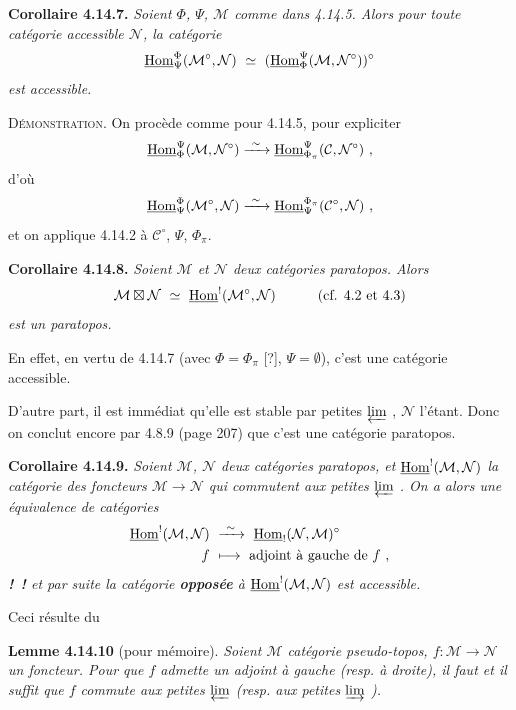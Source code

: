 \noindent\textbf{Corollaire 4.14.7.} {\itshape Soient $\Phi$, $\Psi$, $\mathcal{M}$ comme dans 4.14.5. Alors pour toute catégorie accessible $\mathcal{N}$, la catégorie
\[
\uHom^{\Phi}_{\Psi}(\mathcal{M}^{\circ},\mathcal{N})\ \simeq\ (\uHom^{\Psi}_{\Phi}(\mathcal{M},\mathcal{N}^{\circ}))^{\circ}
\]
est accessible.}

\noindent\textsc{Démonstration}. On procède comme pour 4.14.5, pour expliciter
\[
\underline{\mathrm{Hom}}^{\Psi}_{\Phi}(\mathcal{M},\mathcal{N}^{\circ}) \xrightarrow{\ \sim\ } \underline{\mathrm{Hom}}^{\Psi}_{\Phi_\pi}(\mathcal{C},\mathcal{N}^{\circ})\ ,
\]
d'où
\[
\underline{\mathrm{Hom}}^{\Phi}_{\Psi}(\mathcal{M}^{\circ},\mathcal{N}) \xrightarrow{\ \sim\ } \underline{\mathrm{Hom}}^{\Phi_\pi}_{\Psi}(\mathcal{C}^{\circ},\mathcal{N})\ ,
\]
et on applique 4.14.2 à $\mathcal{C}^{\circ}$, $\Psi$, $\Phi_\pi$.

\noindent\textbf{Corollaire 4.14.8.} {\itshape Soient $\mathcal{M}$ et $\mathcal{N}$ deux catégories paratopos. Alors
\[
\mathcal{M}\boxtimes\mathcal{N}\ \simeq\ \uHom^{!}(\mathcal{M}^{\circ},\mathcal{N}) \qquad\quad \text{(cf. 4.2 et 4.3)}
\]
est un paratopos.}

En effet, en vertu de 4.14.7 (avec $\Phi=\Phi_\pi$ [?], $\Psi=\emptyset$), c'est une catégorie accessible.


D'autre part, il est immédiat qu'elle est stable par petites $\varprojlim$ , $\mathcal{N}$ l'étant. Donc on conclut encore par 4.8.9 (page 207) que c'est une catégorie paratopos.

\noindent\textbf{Corollaire 4.14.9.} {\itshape Soient $\mathcal{M}$, $\mathcal{N}$ deux catégories paratopos, et $\underline{\mathrm{Hom}}^{!}(\mathcal{M},\mathcal{N})$ la catégorie des foncteurs $\mathcal{M}\longrightarrow\mathcal{N}$ qui commutent aux petites $\varprojlim$ . On a alors une équivalence de catégories
\[
\begin{aligned}
\uHom^{!}(\mathcal{M},\mathcal{N}) &\ \xrightarrow{\ \sim\ }\ \uHom_{!}(\mathcal{N},\mathcal{M})^{\circ}\\
f &\ \longmapsto\ \text{adjoint à gauche de } f\ ,
\end{aligned}
\]
\noindent\textup{\textbf{!}}\ \textup{\textbf{!}} et par suite la catégorie \textup{\textbf{opposée}} à $\underline{\mathrm{Hom}}^{!}(\mathcal{M},\mathcal{N})$ est accessible.} %

Ceci résulte du

\noindent\textbf{Lemme 4.14.10} (pour mémoire). {\itshape Soient $\mathcal{M}$ catégorie pseudo-topos, $f:\mathcal{M}\longrightarrow\mathcal{N}$ un foncteur. Pour que $f$ admette un adjoint à gauche (resp. à droite), il faut et il suffit que $f$ commute aux petites $\varprojlim$ (resp. aux petites $\varinjlim$ ).}

